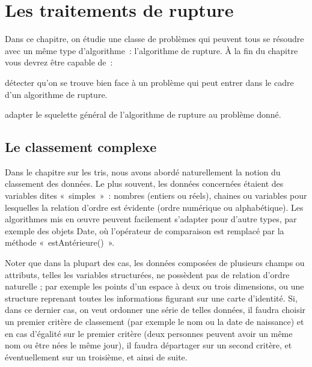 \chapter{Les traitements de rupture}


Dans ce chapitre, on étudie une classe de problèmes qui peuvent tous se
résoudre avec un même type d'algorithme~:
l'algorithme de rupture. À la fin du chapitre vous
devrez être capable de~:

\begin{liste}
	\item 
		détecter qu'on se trouve bien face à un problème qui
		peut entrer dans le cadre d'un algorithme de rupture.
	\item 
		adapter le squelette général de l'algorithme de rupture
		au problème donné.
\end{liste}


\section{Le classement complexe}

Dans le chapitre sur les tris, nous avons abordé naturellement la notion
du classement des données. Le plus souvent, les données concernées étaient
des variables dites «~simples~»~: nombres (entiers ou
réels), chaines ou variables pour lesquelles la relation d’ordre est
évidente (ordre numérique ou alphabétique). Les algorithmes mis en
œuvre peuvent facilement s’adapter pour d’autre types, par exemple des
objets Date, où l’opérateur de comparaison est remplacé par la méthode
«~estAntérieure()~».

Noter que dans la plupart des cas, les données composées de plusieurs
champs ou attributs, telles les variables structurées, ne possèdent pas
de relation d’ordre naturelle ; par exemple les points d’un espace à
deux ou trois dimensions, ou une structure reprenant toutes les
informations figurant sur une carte d’identité. Si, dans ce dernier
cas, on veut ordonner une série de telles données, il faudra choisir un
premier critère de classement (par exemple le nom ou la date de
naissance) et en cas d’égalité sur le premier critère (deux personnes
peuvent avoir un même nom ou être nées le même jour), il faudra
départager sur un second critère, et éventuellement sur un troisième,
et ainsi de suite.


